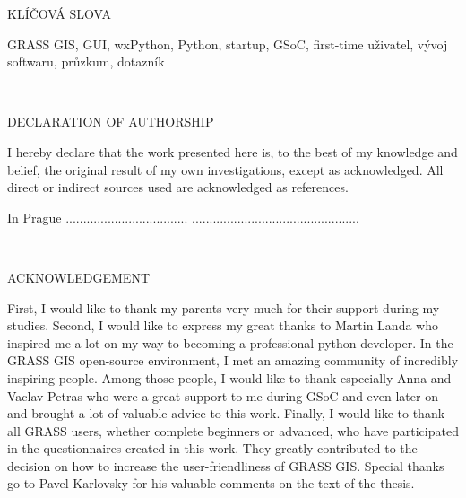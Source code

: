 \documentclass[a4paper,10pt,twoside]{article}
\begin{document}
\vspace{2ex}
\begin{Large}
\noindent KLÍČOVÁ SLOVA
\end{Large}

\large
\noindent
\textrm{GRASS GIS, GUI, wxPython, Python, startup, GSoC, first-time uživatel, vývoj softwaru, průzkum, dotazník}



\newpage ~ \newpage
\thispagestyle{empty}


\newpage
\mbox{}
\vfill
\begin{Large}
\noindent DECLARATION OF AUTHORSHIP
\end{Large}

I hereby declare that the work presented here is, to the best of my
knowledge and belief, the original result of my own investigations,
except as acknowledged. All direct or indirect sources used are
acknowledged as references.  \vspace{3ex}

\noindent In Prague ................................... \hfill ................................................


\newpage ~ \newpage
\thispagestyle{empty}



\newpage
\mbox{}
\vfill
\begin{Large}
\noindent ACKNOWLEDGEMENT
\end{Large}

First, I would like to thank my parents very much for their support
during my studies. Second, I would like to express my great thanks to
Martin Landa who inspired me a lot on my way to
becoming a professional python developer. In the GRASS GIS 
open-source environment, I met an amazing community of incredibly
inspiring people. Among those people, I would like to thank especially
Anna and Vaclav Petras who were a great support to me during GSoC and
even later on and brought a lot of valuable advice to this
work. Finally, I would like to thank all GRASS users, whether complete
beginners or advanced, who have participated in the questionnaires 
created in this work. They greatly contributed to the decision on how to 
increase the user-friendliness of GRASS GIS. Special thanks go to Pavel Karlovsky 
for his valuable comments on the text of the thesis.
\end{document}

